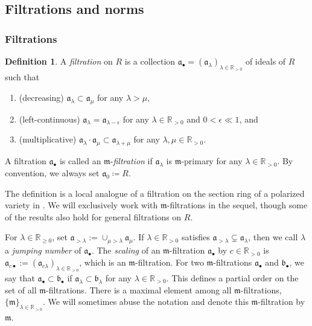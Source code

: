 \documentclass[11pt, leqno]{amsart}%
\theoremstyle{plain}
\theoremstyle{definition}
\newtheorem{definition}[theorem]{Definition}
\theoremstyle{remark}
\newcommand{\bR}{\mathbb{R}}
\newcommand{\fa}{\mathfrak{a}}
\newcommand{\fb}{\mathfrak{b}}
\newcommand{\fm}{\mathfrak{m}}
\newcommand{\R}{\mathbb{R}}
\newcommand{\la}{\lambda}
\numberwithin{equation}{section}
\begin{document}
\subsection{Filtrations and norms}\label{ssec:definition}

\subsubsection{Filtrations}\label{sssec:filtrations}

\begin{definition}\label{defn:filtration}
    A \emph{filtration} on $R$ is a collection $\fa_\bullet =(\fa_\la )_{\la \in \R_{>0}}$  of ideals of $R$ such that
    \begin{enumerate}
        \item (decreasing) $\fa_\la \subset \fa_{\mu}$ for any $\la >\mu$,
		
        \item (left-continuous) $\fa_{\la} = \fa_{\la-\epsilon}$ for any $\lambda\in\bR_{>0}$ and $0<\epsilon\ll1$, and
		
        \item (multiplicative) $\fa_{\la} \cdot \fa_{\mu} \subset \fa_{\la+ \mu}$ for any $\lambda,\mu\in\bR_{>0}$.
    \end{enumerate}
    A filtration $\fa_\bullet$ is called an $\fm$-\emph{filtration} if $\fa_\lambda$ is $\fm$-primary for any $\lambda\in\bR_{>0}$.
    By convention, we always set $\fa_{0}\coloneqq R$. 
\end{definition}



The definition is a local analogue of a filtration on the section ring of a polarized variety in \cite{BHJ17}. We will exclusively work with $\fm$-filtrations in the sequel, though some of the results also hold for general filtrations on $R$.

For $\lambda\in\bR_{\ge 0}$, set $\fa_{>\lambda}:=\cup_{\mu>\lambda}\fa_\mu$. If $\lambda\in\R_{>0}$ satisfies $\fa_{>\lambda}\subsetneq \fa_\lambda$, then we call $\lambda$ a \emph{jumping number} of $\fa_\bullet$. The \emph{scaling} of an $\fm$-filtration $\fa_\bullet$ by $c\in \bR_{>0}$ is $\fa_{c\bullet}:=(\fa_{c \la } )_{\la\in \bR_{>0}}$, which is an $\fm$-filtration. For two $\fm$-filtrations $\fa_\bullet$ and $\fb_\bullet$, we say that $\fa_\bullet\subset \fb_\bullet$ if $\fa_\lambda\subset \fb_\lambda$ for any $\lambda\in\bR_{>0}$. This defines a partial order on the set of all $\fm$-filtrations. There is a maximal element among all $\fm$-filtrations, $\{\fm\}_{\lambda\in\bR_{>0}}$. We will sometimes abuse the notation and denote this $\fm$-filtration by $\fm$.
\end{document}
